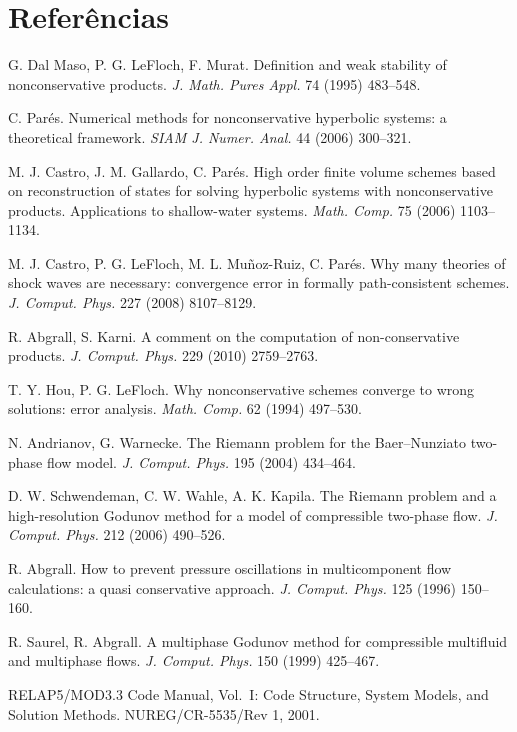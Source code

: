 \documentclass[11pt,a4paper]{article}
\theoremstyle{definition}
\theoremstyle{remark}
\begin{document}
\section*{Referências}
\small
\begin{enumerate}[label={[\arabic*]},leftmargin=*]
\item G. Dal Maso, P. G. LeFloch, F. Murat. Definition and weak stability of nonconservative products. \emph{J. Math. Pures Appl.} 74 (1995) 483--548.
\item C. Parés. Numerical methods for nonconservative hyperbolic systems: a theoretical framework. \emph{SIAM J. Numer. Anal.} 44 (2006) 300--321.
\item M. J. Castro, J. M. Gallardo, C. Parés. High order finite volume schemes based on reconstruction of states for solving hyperbolic systems with nonconservative products. Applications to shallow-water systems. \emph{Math. Comp.} 75 (2006) 1103--1134.
\item M. J. Castro, P. G. LeFloch, M. L. Muñoz-Ruiz, C. Parés. Why many theories of shock waves are necessary: convergence error in formally path-consistent schemes. \emph{J. Comput. Phys.} 227 (2008) 8107--8129.
\item R. Abgrall, S. Karni. A comment on the computation of non-conservative products. \emph{J. Comput. Phys.} 229 (2010) 2759--2763.
\item T. Y. Hou, P. G. LeFloch. Why nonconservative schemes converge to wrong solutions: error analysis. \emph{Math. Comp.} 62 (1994) 497--530.
\item N. Andrianov, G. Warnecke. The Riemann problem for the Baer--Nunziato two-phase flow model. \emph{J. Comput. Phys.} 195 (2004) 434--464.
\item D. W. Schwendeman, C. W. Wahle, A. K. Kapila. The Riemann problem and a high-resolution Godunov method for a model of compressible two-phase flow. \emph{J. Comput. Phys.} 212 (2006) 490--526.
\item R. Abgrall. How to prevent pressure oscillations in multicomponent flow calculations: a quasi conservative approach. \emph{J. Comput. Phys.} 125 (1996) 150--160.
\item R. Saurel, R. Abgrall. A multiphase Godunov method for compressible multifluid and multiphase flows. \emph{J. Comput. Phys.} 150 (1999) 425--467.
\item RELAP5/MOD3.3 Code Manual, Vol.\ I: Code Structure, System Models, and Solution Methods. NUREG/CR-5535/Rev 1, 2001.
\end{enumerate}
\end{document}
